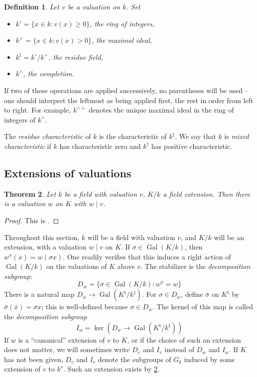 \documentclass{article}
\DeclareMathOperator{\gal}{Gal}
\newtheorem{definition}{Definition}
\newtheorem{theorem}[definition]{Theorem}
\numberwithin{definition}{subsection}
\begin{document}
\begin{definition}
Let $v$ be a valuation on $k$. Set 
\begin{itemize}
  \item $k^\circ = \{x\in k:v(x)\geqslant 0\}$, the \emph{ring of integers}, 
  \item $k^+ = \{x\in k : v(x)>0\}$, the \emph{maximal ideal}, 
  \item $k^\natural = k^\circ/k^+$, the \emph{residue field}, 
  \item $k^\wedge$, the \emph{completion}. 
\end{itemize}
\end{definition}
If two of these operations are applied successively, no parentheses will be 
used -- one should interpret the leftmost as being applied first, the rest in 
order from left to right. For example, $k^{\wedge+}$ denotes the unique 
maximal ideal in the ring of integers of $k^\wedge$. 

The \emph{residue characteristic} of $k$ is the characteristic of 
$k^\natural$. We say that $k$ is \emph{mixed characteristic} if 
$k$ has characteristic zero and $k^\natural$ has positive characteristic. 





\subsection{Extensions of valuations}

\begin{theorem}\label{valuations-extend}
Let $k$ be a field with valuation $v$, $K/k$ a field extension. Then there is 
a valuation $w$ on $K$ with $w\mid v$. 
\end{theorem}
\begin{proof}
This is \cite[III.4.3 pr.5]{Bou}. 
\end{proof}

Throughout this section, $k$ will be a field with valuation $v$, and $K/k$ 
will be an extension, with a valuation $w\mid v$ on $K$. If 
$\sigma\in\gal(K/k)$, then $w^\sigma(x) = w(\sigma x)$. One readily verifies 
that this induces a right action of $\gal(K/k)$ on the valuations of $K$ above 
$v$. The stabilizer is the \emph{decomposition subgroup}:
\[
  D_w = \{\sigma\in \gal(K/k) : w^\sigma = w\}
\]
There is a natural map $D_w\to \gal(K^\natural/k^\natural)$. For 
$\sigma\in D_w$, define $\bar\sigma$ on $K^\natural$ by 
$\bar\sigma(\bar x) = \overline{\sigma x}$; this is well-defined because 
$\sigma\in D_w$. The kernel of this map is called the \emph{decomposition 
subgroup}
\[
  I_w = \ker\left(D_w \to \gal(K^\natural/k^\natural)\right)
\]
If $w$ is a ``canonical'' extension of $v$ to $K$, or if the choice of such an 
extension does not matter, we will sometimes write $D_v$ and $I_v$ instead of 
$D_w$ and $I_w$. If $K$ has not been given, $D_v$ and $I_v$ denote the 
subgroups of $G_k$ induced by some extension of $v$ to $k^s$. Such an 
extension exists by \ref{valuations-extend}. 
\end{document}
